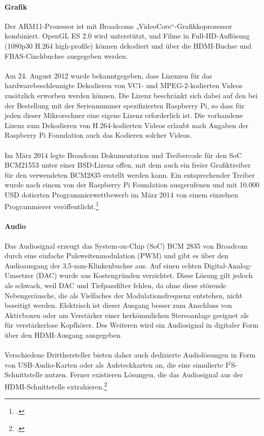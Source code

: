 \paragraph{Grafik}
Der ARM11-Prozessor ist mit Broadcoms „VideoCore“-Grafikkoprozessor kombiniert. OpenGL ES 2.0 wird unterstützt, und Filme in Full-HD-Auflösung (1080p30 H.264 high-profile) können dekodiert und über die HDMI-Buchse und FBAS-Cinchbuchse ausgegeben werden.\\
\\
Am 24. August 2012 wurde bekanntgegeben, dass Lizenzen für das hardwarebeschleunigte Dekodieren von VC1- und MPEG-2-kodierten Videos zusätzlich erworben werden können. Die Lizenz beschränkt sich dabei auf den bei der Bestellung mit der Seriennummer spezifizierten Raspberry Pi, so dass für jeden dieser Mikrorechner eine eigene Lizenz erforderlich ist. Die vorhandene Lizenz zum Dekodieren von H.264-kodierten Videos erlaubt nach Angaben der Raspberry Pi Foundation auch das Kodieren solcher Videos.\\
\\
Im März 2014 legte Broadcom Dokumentation und Treibercode für den SoC BCM21553 unter einer BSD-Lizenz offen, mit dem auch ein freier Grafiktreiber für den verwendeten BCM2835 erstellt werden kann. Ein entsprechender Treiber wurde nach einem von der Raspberry Pi Foundation ausgerufenen und mit 10.000 USD dotierten Programmierwettbewerb im März 2014 von einem einzelnen Programmierer veröffentlicht.\footcite{shit_raspi}

\paragraph{Audio}

Das Audiosignal erzeugt das System-on-Chip (SoC) BCM 2835 von Broadcom durch eine einfache Pulsweitenmodulation (PWM) und gibt es über den Audioausgang der 3,5-mm-Klinkenbuchse aus. Auf einen echten Digital-Analog-Umsetzer (DAC) wurde aus Kostengründen verzichtet. Diese Lösung gilt jedoch als schwach, weil DAC und Tiefpassfilter fehlen, da ohne diese störende Nebengeräusche, die als Vielfaches der Modulationsfrequenz entstehen, nicht beseitigt werden. Elektrisch ist dieser Ausgang besser zum Anschluss von Aktivboxen oder am Verstärker einer herkömmlichen Stereoanlage geeignet als für verstärkerlose Kopfhörer. Des Weiteren wird ein Audiosignal in digitaler Form über den HDMI-Ausgang ausgegeben.\\
\\
Verschiedene Dritthersteller bieten daher auch dedizierte Audiolösungen in Form von USB-Audio-Karten oder als Aufsteckkarten an, die eine simulierte I$^2$S-Schnittstelle nutzen. Ferner existieren Lösungen, die das Audiosignal aus der HDMI-Schnittstelle extrahieren.\footcite{shit_raspi}

